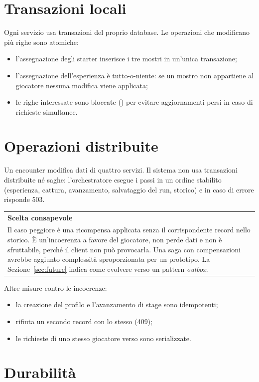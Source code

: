 \documentclass[11pt,a4paper]{report}
\makeatletter
\newenvironment{nota}[1]
  {\par\smallskip\noindent\begin{tabular}{@{}p{\dimexpr\linewidth-2\tabcolsep}@{}}\toprule\textsf{\textbf{\small #1}}\\[0.1em]\small}
  {\\\bottomrule\end{tabular}\par\smallskip}
\makeatother
\begin{document}
\section{Transazioni locali}

Ogni servizio usa transazioni del proprio database. Le operazioni che modificano più righe sono atomiche:
\begin{itemize}
  \item l'assegnazione degli starter inserisce i tre mostri in un'unica transazione;
  \item l'assegnazione dell'esperienza è tutto-o-niente: se un mostro non appartiene al giocatore nessuna modifica viene applicata;
  \item le righe interessate sono bloccate () per evitare aggiornamenti persi in caso di richieste simultanee.
\end{itemize}

\section{Operazioni distribuite}

Un encounter modifica dati di quattro servizi. Il sistema non usa transazioni distribuite né saghe: l'orchestratore esegue i passi in un ordine stabilito (esperienza, cattura, avanzamento, salvataggio del run, storico) e in caso di errore risponde 503.

\begin{nota}{Scelta consapevole}
Il caso peggiore è una ricompensa applicata senza il corrispondente record nello storico. È un'incoerenza a favore del giocatore, non perde dati e non è sfruttabile, perché il client non può provocarla. Una saga con compensazioni avrebbe aggiunto complessità sproporzionata per un prototipo. La Sezione~\ref{sec:future} indica come evolvere verso un pattern \emph{outbox}.
\end{nota}

Altre misure contro le incoerenze:
\begin{itemize}
  \item la creazione del profilo e l'avanzamento di stage sono idempotenti;
  \item {} rifiuta un secondo record con lo stesso  (409);
  \item le richieste di uno stesso giocatore verso  sono serializzate.
\end{itemize}

\section{Durabilità}
\end{document}
